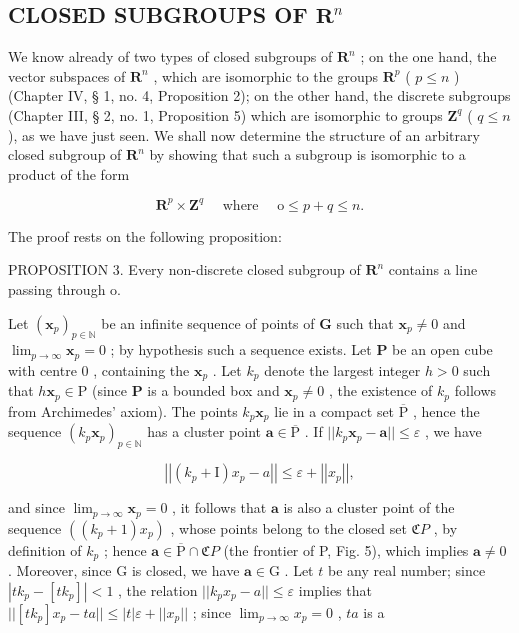 \subsection{\texorpdfstring{CLOSED SUBGROUPS OF \(\mathbf{R}^n\)}{CLOSED SUBGROUPS OF R TO THE N}}

We know already of two types of closed subgroups of \(\mathbf{R}^n\) ; on the one hand, the vector subspaces of \(\mathbf{R}^n\) , which are isomorphic to the groups \(\mathbf{R}^p\) ( \(p \leqslant n\) ) (Chapter IV, § 1, no. 4, Proposition 2); on the other hand, the discrete subgroups (Chapter III, § 2, no. 1, Proposition 5) which are isomorphic to groups \(\mathbf{Z}^q\) ( \(q \leqslant n\) ), as we have just seen. We shall now determine the structure of an arbitrary closed subgroup of \(\mathbf{R}^n\) by showing that such a subgroup is isomorphic to a product of the form

\[
\mathbf {R} ^ {p} \times \mathbf {Z} ^ {q} \quad \text { where } \quad \mathrm{o} \leqslant p + q \leqslant n.
\]

The proof rests on the following proposition:

PROPOSITION 3. Every non-discrete closed subgroup of \(\mathbf{R}^n\) contains a line passing through o.

Let \((\pmb{x}_p)_{p\in \mathbb{N}}\) be an infinite sequence of points of \(\mathbf{G}\) such that \(\pmb{x}_p\neq 0\) and \(\lim_{p\to \infty}\pmb{x}_p = 0\) ; by hypothesis such a sequence exists. Let \(\mathbf{P}\) be an open cube with centre \(0\) , containing the \(\pmb{x}_p\) . Let \(k_{p}\) denote the largest integer \(h > 0\) such that \(h\pmb{x}_p\in \mathrm{P}\) (since \(\mathbf{P}\) is a bounded box and \(\pmb{x}_p\neq 0\) , the existence of \(k_{p}\) follows from Archimedes' axiom). The points \(k_{p}\pmb{x}_{p}\) lie in a compact set \(\overline{\mathrm{P}}\) , hence the sequence \((k_{p}\pmb{x}_{p})_{p\in \mathbb{N}}\) has a cluster point \(\pmb {a}\in \overline{\mathrm{P}}\) . If \(||k_p\pmb {x}_p - \pmb {a}||\leqslant \varepsilon\) , we have

\[
\left| \left| \left(k _ {p} + \mathrm{I}\right) x _ {p} - a \right| \right| \leqslant \varepsilon + \left| \left| x _ {p} \right| \right|,
\]

and since \(\lim_{p\to \infty}\boldsymbol{x}_p = 0\) , it follows that \(\boldsymbol{a}\) is also a cluster point of the sequence \(((k_p + 1)x_p)\) , whose points belong to the closed set \(\mathfrak{C}P\) , by definition of \(k_{p}\) ; hence \(\boldsymbol{a} \in \overline{\mathrm{P}} \cap \mathfrak{C}P\) (the frontier of P, Fig. 5), which implies \(\boldsymbol{a} \neq 0\) . Moreover, since G is closed, we have \(\boldsymbol{a} \in \mathrm{G}\) . Let \(t\) be any real number; since \(|tk_p - [tk_p]| < 1\) , the relation \(||k_p x_p - a|| \leqslant \varepsilon\) implies that \(||[tk_p]x_p - ta|| \leqslant |t| \varepsilon + ||x_p||\) ; since \(\lim_{p \to \infty} x_p = 0\) , \(ta\) is a

